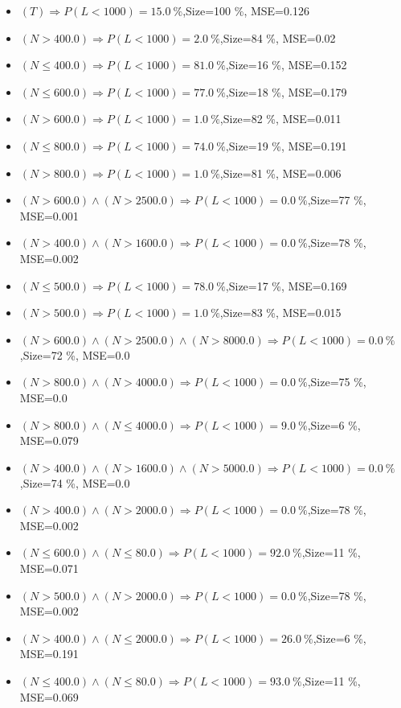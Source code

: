 \documentclass[numbered]{CSL}
\begin{document}
\begin{itemize}
\item $(T) \Rightarrow P(L < 1 000) = 15.0~\%$,\hfill Size=100 \%, MSE=0.126
\item $(N > 400.0) \Rightarrow P(L < 1 000) = 2.0~\%$,\hfill Size=84 \%, MSE=0.02
\item $(N \leq 400.0) \Rightarrow P(L < 1 000) = 81.0~\%$,\hfill Size=16 \%, MSE=0.152
\item $(N \leq 600.0) \Rightarrow P(L < 1 000) = 77.0~\%$,\hfill Size=18 \%, MSE=0.179
\item $(N > 600.0) \Rightarrow P(L < 1 000) = 1.0~\%$,\hfill Size=82 \%, MSE=0.011
\item $(N \leq 800.0) \Rightarrow P(L < 1 000) = 74.0~\%$,\hfill Size=19 \%, MSE=0.191
\item $(N > 800.0) \Rightarrow P(L < 1 000) = 1.0~\%$,\hfill Size=81 \%, MSE=0.006
\item $(N > 600.0) \land (N > 2500.0) \Rightarrow P(L < 1 000) = 0.0~\%$,\hfill Size=77 \%, MSE=0.001
\item $(N > 400.0) \land (N > 1600.0) \Rightarrow P(L < 1 000) = 0.0~\%$,\hfill Size=78 \%, MSE=0.002
\item $(N \leq 500.0) \Rightarrow P(L < 1 000) = 78.0~\%$,\hfill Size=17 \%, MSE=0.169
\item $(N > 500.0) \Rightarrow P(L < 1 000) = 1.0~\%$,\hfill Size=83 \%, MSE=0.015
\item $(N > 600.0) \land (N > 2500.0) \land (N > 8000.0) \Rightarrow P(L < 1 000) = 0.0~\%$,\hfill Size=72 \%, MSE=0.0
\item $(N > 800.0) \land (N > 4000.0) \Rightarrow P(L < 1 000) = 0.0~\%$,\hfill Size=75 \%, MSE=0.0
\item $(N > 800.0) \land (N \leq 4000.0) \Rightarrow P(L < 1 000) = 9.0~\%$,\hfill Size=6 \%, MSE=0.079
\item $(N > 400.0) \land (N > 1600.0) \land (N > 5000.0) \Rightarrow P(L < 1 000) = 0.0~\%$,\hfill Size=74 \%, MSE=0.0
\item $(N > 400.0) \land (N > 2000.0) \Rightarrow P(L < 1 000) = 0.0~\%$,\hfill Size=78 \%, MSE=0.002
\item $(N \leq 600.0) \land (N \leq 80.0) \Rightarrow P(L < 1 000) = 92.0~\%$,\hfill Size=11 \%, MSE=0.071
\item $(N > 500.0) \land (N > 2000.0) \Rightarrow P(L < 1 000) = 0.0~\%$,\hfill Size=78 \%, MSE=0.002
\item $(N > 400.0) \land (N \leq 2000.0) \Rightarrow P(L < 1 000) = 26.0~\%$,\hfill Size=6 \%, MSE=0.191
\item $(N \leq 400.0) \land (N \leq 80.0) \Rightarrow P(L < 1 000) = 93.0~\%$,\hfill Size=11 \%, MSE=0.069
\end{itemize}
\end{document}

